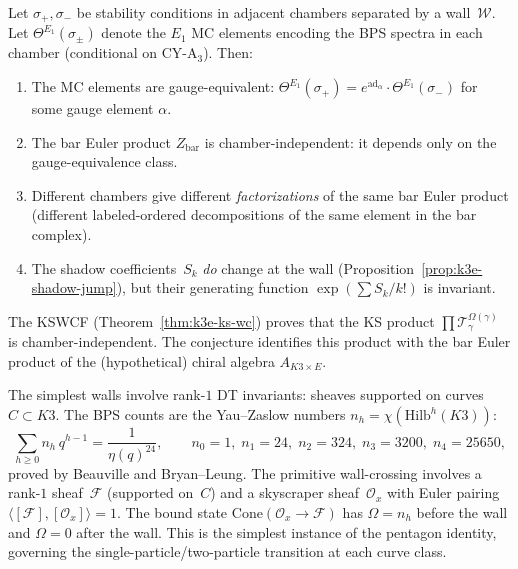 \begin{conjecture}
\label{conj:k3e-bar-euler-invariance}
\ClaimStatusConjectured
Let $\sigma_+, \sigma_-$ be stability conditions in adjacent chambers separated by a wall~$\mathcal{W}$. Let $\Theta^{E_1}(\sigma_\pm)$ denote the $E_1$ MC elements encoding the BPS spectra in each chamber (conditional on CY-A$_3$). Then:
\begin{enumerate}[label=(\roman*)]
 \item The MC elements are gauge-equivalent: $\Theta^{E_1}(\sigma_+) = e^{\mathrm{ad}_\alpha} \cdot \Theta^{E_1}(\sigma_-)$ for some gauge element $\alpha$.
 \item The bar Euler product $Z_{\mathrm{bar}}$ is chamber-independent: it depends only on the gauge-equivalence class.
 \item Different chambers give different \emph{factorizations} of the same bar Euler product (different labeled-ordered decompositions of the same element in the bar complex).
 \item The shadow coefficients~$S_k$ \emph{do} change at the wall (Proposition~\ref{prop:k3e-shadow-jump}), but their generating function $\exp(\sum S_k / k!)$ is invariant.
\end{enumerate}
The KSWCF (Theorem~\ref{thm:k3e-ks-wc}) proves that the KS product $\prod \mathcal{T}_\gamma^{\Omega(\gamma)}$ is chamber-independent. The conjecture identifies this product with the bar Euler product of the (hypothetical) chiral algebra $A_{K3 \times E}$.
\ClaimStatusConjectured
\end{conjecture}

\begin{remark}
\label{rem:k3e-primitive-wc}
The simplest walls involve rank-$1$ DT invariants: sheaves supported on curves~$C \subset K3$. The BPS counts are the Yau--Zaslow numbers $n_h = \chi(\mathrm{Hilb}^h(K3))$:
\[
 \sum_{h \geq 0} n_h \, q^{h-1} = \frac{1}{\eta(q)^{24}}, \qquad n_0 = 1, \; n_1 = 24, \; n_2 = 324, \; n_3 = 3200, \; n_4 = 25650,
\]
proved by Beauville and Bryan--Leung. The primitive wall-crossing involves a rank-$1$ sheaf~$\mathcal{F}$ (supported on~$C$) and a skyscraper sheaf~$\mathcal{O}_x$ with Euler pairing $\langle [\mathcal{F}], [\mathcal{O}_x] \rangle = 1$. The bound state $\mathrm{Cone}(\mathcal{O}_x \to \mathcal{F})$ has $\Omega = n_h$ before the wall and $\Omega = 0$ after the wall. This is the simplest instance of the pentagon identity, governing the single-particle/two-particle transition at each curve class.
\end{remark}

